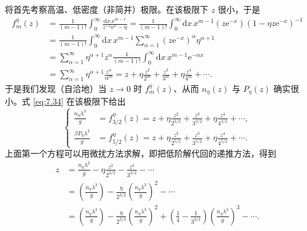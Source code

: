 将首先考察高温、低密度（非简并）极限。在该极限下 $z$ 很小，于是
\begin{equation}\label{eq:7.35}
\begin{aligned}
f_m^\eta(z)&=\frac1{(m-1)!}\int_0^\infty\frac{\mathrm dx\,x^{m-1}}{z^{-1}\mathrm e^x-\eta}=\frac1{(m-1)!}\int_0^\infty\mathrm dx\,x^{m-1}\left(z\mathrm e^{-x}\right)\left(1-\eta z\mathrm e^{-x}\right)^{-1}\\
&=\frac1{(m-1)!}\int_0^\infty\mathrm dx\,x^{m-1}\sum_{\alpha=1}^\infty\left(z\mathrm e^{-x}\right)^\alpha\eta^{\alpha+1}\\
&=\sum_{\alpha=1}^\infty\eta^{\alpha+1}z^\alpha\frac1{(m-1)!}\int_0^\infty\mathrm dx\,x^{m-1}\mathrm e^{-\alpha x}\\
&=\sum_{\alpha=1}^\infty\eta^{\alpha+1}\frac{z^\alpha}{\alpha^m}=z+\eta\frac{z^2}{2^m}+\frac{z^3}{3^m}+\eta\frac{z^4}{4^m}+\cdots.
\end{aligned}
\end{equation}
于是我们发现（自洽地）当 $z\to0$ 时 $f_m^\eta(z)$、从而 $n_\eta(z)$ 与 $P_\eta(z)$ 确实很小。式 \eqref{eq:7.34} 在该极限下给出
\begin{equation}\label{eq:7.36}
\left\{\begin{aligned}
\frac{n_\eta\lambda^3}g&=f_{3/2}^\eta(z)=z+\eta\frac{z^2}{2^{3/2}}+\frac{z^3}{3^{3/2}}+\eta\frac{z^4}{4^{3/2}}+\cdots,\\[1ex]
\frac{\beta P_\eta\lambda^3}g&=f_{5/2}^\eta(z)=z+\eta\frac{z^2}{2^{5/2}}+\frac{z^3}{3^{5/2}}+\eta\frac{z^4}{4^{5/2}}+\cdots.
\end{aligned}\right.
\end{equation}
上面第一个方程可以用微扰方法求解，即把低阶解代回的递推方法，得到
\begin{equation}\label{eq:7.37}
\begin{aligned}
z&=\frac{n_\eta\lambda^3}g-\eta\frac{z^2}{2^{3/2}}-\frac{z^3}{3^{3/2}}-\cdots\\
&=\left(\frac{n_\eta\lambda^3}g\right)-\frac\eta{2^{3/2}}\left(\frac{n_\eta\lambda^3}g\right)^2-\cdots\\
&=\left(\frac{n_\eta\lambda^3}g\right)-\frac\eta{2^{3/2}}\left(\frac{n_\eta\lambda^3}g\right)^2+\left(\frac14-\frac1{3^{3/2}}\right)\left(\frac{n_\eta\lambda^3}g\right)^3-\cdots.
\end{aligned}
\end{equation}



